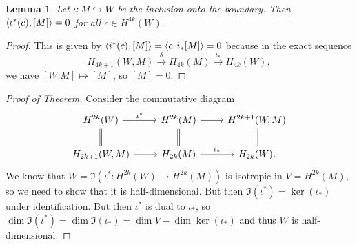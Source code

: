 \documentclass[leqno, openany]{memoir}
\newtheorem{lem}[thm]{Lemma}
\theoremstyle{definition}
\theoremstyle{remark}
\theoremstyle{plain}
\theoremstyle{definition}
\theoremstyle{remark}
\begin{document}
\begin{lem}
    Let $\iota \colon M \hookrightarrow W$ be the inclusion onto the boundary. Then $\ev{\iota^*(c), [M]} = 0$ for all $c \in H^{4k}(W)$.
\end{lem}

\begin{proof}
    This is given by $\ev{i^*(c), [M]} = \ev{c, i_* [M]} = 0$ because in the exact sequence 
    \[ H_{4k+1}(W, M) \xrightarrow{\delta} H_{4k}(M) \xrightarrow{\iota_*} H_{4k}(W),\]
    we have $[W.M] \mapsto [M]$, so $[M] = 0$.
\end{proof}

\begin{proof}[Proof of Theorem]
    Consider the commutative diagram
    \begin{equation*}
    \begin{tikzcd}
        H^{2k}(W) \ar{r}{\iota^*} \ar[equal]{d} & H^{2k}(M) \ar[equal]{d} \ar{r} & H^{2k+1}(W, M) \ar[equal]{d} \\
        H_{2k+1}(W, M) \ar{r} & H_{2k}(M) \ar{r}{\iota_*} & H_{2k}(W).
    \end{tikzcd}
    \end{equation*}
    We know that $W = \Im(\iota^* \colon H^{2k}(W) \to H^{2k}(M))$ is isotropic in $V = H^{2k}(M)$, so we need to show that it is half-dimensional. But then $\Im(\iota^*) = \ker (\iota_*)$ under identification. But then $\iota^*$ is dual to $\iota_*$, so $\dim \Im(\iota^*) = \dim \Im(\iota_*) = \dim V - \dim \ker (\iota_*)$ and thus $W$ is half-dimensional.
\end{proof}
\end{document}
